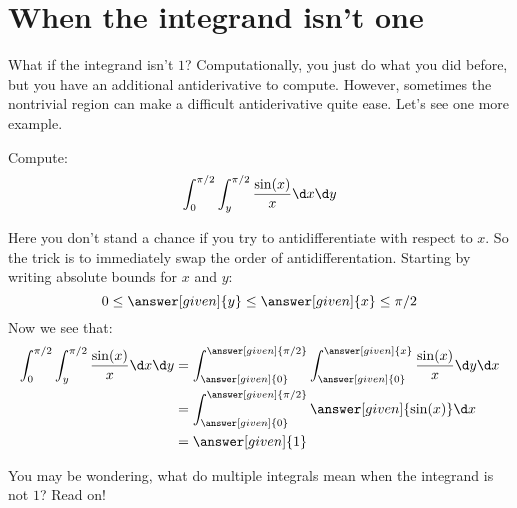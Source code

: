 \documentclass{ximera}
\begin{document}
\section{When the integrand isn't one}

What if the integrand isn't $1$? Computationally, you just do what you
did before, but you have an additional antiderivative to
compute. However, sometimes the nontrivial region can make a difficult antiderivative quite ease. Let's see one more example.

\begin{example}
  Compute:
  \[
  \int_0^{\pi/2}\int_y^{\pi/2} \frac{\sin(x)}{x} \d x \d y
  \]
  \begin{explanation}
    Here you don't stand a chance if you try to antidifferentiate with
    respect to $x$. So the trick is to immediately swap the order of
    antidifferentation. Starting by writing absolute bounds for $x$
    and $y$:
    \[
    0\le \answer[given]{y}\le \answer[given]{x}\le\pi/2
    \]
    Now we see that:
    \begin{align*}
      \int_0^{\pi/2}\int_y^{\pi/2} \frac{\sin(x)}{x} \d x \d y &= \int_{\answer[given]{0}}^{\answer[given]{\pi/2}}\int_{\answer[given]{0}}^{\answer[given]{x}} \frac{\sin(x)}{x} \d y \d x\\
      &= \int_{\answer[given]{0}}^{\answer[given]{\pi/2}} \answer[given]{\sin(x)} \d x\\
      &=\answer[given]{1}
    \end{align*}
  \end{explanation}
\end{example}


You may be wondering, what do multiple integrals mean when the
integrand is not $1$? Read on! 
\end{document}
